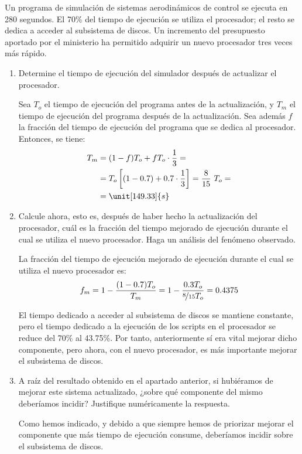 \begin{ejercicio}
Un programa de simulación de sistemas aerodinámicos de control se ejecuta en 280 segundos. El 70\% del tiempo de ejecución se utiliza el procesador; el resto se dedica a acceder al subsistema de discos. Un incremento del presupuesto aportado por el ministerio ha permitido adquirir un nuevo procesador tres veces más rápido.
\begin{enumerate}
    \item Determine el tiempo de ejecución del simulador después de actualizar el procesador.
    
    Sea $T_o$ el tiempo de ejecución del programa antes de la actualización, y $T_m$ el tiempo de ejecución del programa después de la actualización. Sea además $f$ la fracción del tiempo de ejecución del programa que se dedica al procesador. Entonces, se tiene:
    \begin{align*}
        T_m &= (1-f)T_o + fT_o\cdot \dfrac{1}{3}
        =\\&= T_o\left[(1-0.7) + 0.7\cdot \dfrac{1}{3}\right]
        = \dfrac{8}{15}\ T_o
        =\\&= \unit[149.33]{s}
    \end{align*}
    \item Calcule ahora, esto es, después de haber hecho la actualización del procesador, cuál es la fracción del tiempo mejorado de ejecución durante el cual se utiliza el nuevo procesador. Haga un análisis del fenómeno observado.
    
    La fracción del tiempo de ejecución mejorado de ejecución durante el cual se utiliza el nuevo procesador es:
    \begin{equation*}
        f_m = 1-\dfrac{(1-0.7)T_o}{T_m} = 1-\dfrac{0.3T_o}{\nicefrac{8}{15}T_o} = 0.4375
    \end{equation*}

    El tiempo dedicado a acceder al subsistema de discos se mantiene constante, pero el tiempo dedicado a la ejecución de los scripts en el procesador se reduce del 70\% al 43.75\%. Por tanto, anteriormente sí era vital mejorar dicho componente, pero ahora, con el nuevo procesador, es más importante mejorar el subsistema de discos.
    \item A raíz del resultado obtenido en el apartado anterior, si hubiéramos de mejorar este sistema actualizado, ¿sobre qué componente del mismo deberíamos incidir? Justifique numéricamente la respuesta.
    
    Como hemos indicado, y debido a que siempre hemos de priorizar mejorar el componente que más tiempo de ejecución consume, deberíamos incidir sobre el subsistema de discos.
\end{enumerate}
\end{ejercicio}
\begin{comment}
SOLUCIÓN: El tiempo de ejecución obtenido con la actualización del procesador es de 149,3 segundos. En el sistema actualizado el procesador se utiliza durante la fracción f = 0,44 del tiempo de ejecución anterior. En este contexto las mejoras significativas del sistema se conseguirán actuando sobre el subsistema de discos.
\end{comment}

